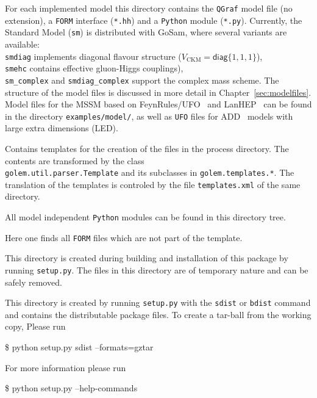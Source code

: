 \documentclass[11pt,a4paper]{refrep}
\newcommand{\gosamversion}{{2{.}0}}
\newcommand{\gosamv}[1][\gosamversion]{{\sc GoSam}\xspace}
\newcommand{\qgraf}{{\tt QGraf}\xspace}
\newcommand{\form}{{\tt FORM}\xspace}
\newcommand{\python}{{\tt Python}\xspace}
\begin{document}
 For each implemented model this directory
contains the \qgraf model file (no extension), a \form interface
(\texttt{*.hh}) and a \python module (\texttt{*.py}). Currently,
the Standard Model (\texttt{sm}) is distributed with \gosamv, 
where several variants are available:\\
\texttt{smdiag} implements
diagonal flavour structure ($V_{\text{CKM}}=\mathsf{diag}\{1,1,1\}$),\\
{\tt smehc} contains effective gluon-Higgs couplings),\\
\texttt{sm\_complex} and \texttt{smdiag\_complex} support the complex mass scheme. 
The structure of the model files is discussed in more detail in
Chapter~\ref{sec:modelfiles}. Model files for the MSSM based on 
FeynRules/UFO~\cite{Degrande:2011ua}  and LanHEP~\cite{Semenov:2010qt}
can be found in the directory 
\texttt{examples/model/}, as well as {\tt UFO}  files for ADD~\cite{ArkaniHamed:1998rs}
models with large extra dimensions (LED).

 Contains templates for the creation
of the files in the process directory. The contents are transformed
by the class\\
\texttt{golem.util.parser.Template} and its subclasses
in \texttt{golem.templates.*}. The translation of the templates is
controled by the file \texttt{templates.xml} of the same directory.

 All model independent \python modules
can be found in this directory tree.

 Here one finds all \form files
which are not part of the template.

 This directory is created during
building and installation of this package by running \texttt{setup.py}.
The files in this directory are of temporary nature and can be safely
removed.

 This directory is created by running
\texttt{setup.py} with the \texttt{sdist} or \texttt{bdist} command
and contains the distributable package files.
To create a tar-ball from the working copy, Please run
\begin{example}
\$ python setup.py sdist --formats=gztar
\end{example}
For more information
please run
\begin{example}
\$ python setup.py --help-commands
\end{example}
\end{document}
